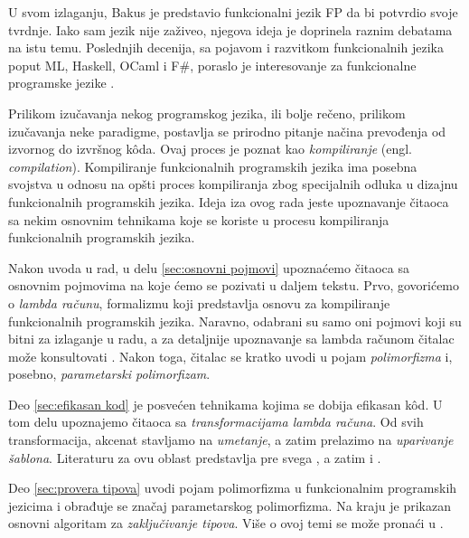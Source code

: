 \documentclass[a4paper]{article}
\begin{document}
U svom izlaganju, Bakus je predstavio funkcionalni jezik FP da bi potvrdio svoje tvrdnje. Iako sam jezik nije zaživeo, njegova ideja je doprinela raznim debatama na istu temu. Poslednjih decenija, sa pojavom i razvitkom funkcionalnih jezika poput ML, Haskell, OCaml i F\#, poraslo je interesovanje za funkcionalne programske jezike \cite{Concepts-of-Programming-Languages}.

Prilikom izučavanja nekog programskog jezika, ili bolje rečeno, prilikom izučavanja neke paradigme, postavlja se prirodno pitanje načina prevođenja od izvornog do izvršnog k\^oda. Ovaj proces je poznat kao \textit{kompiliranje} (engl. \textit{compilation}). Kompiliranje funkcionalnih programskih jezika ima posebna svojstva u odnosu na opšti proces kompiliranja zbog specijalnih odluka u dizajnu funkcionalnih programskih jezika. Ideja iza ovog rada jeste upoznavanje čitaoca sa nekim osnovnim tehnikama koje se koriste u procesu kompiliranja funkcionalnih programskih jezika.

Nakon uvoda u rad, u delu \ref{sec:osnovni pojmovi} upoznaćemo čitaoca sa osnovnim pojmovima na koje ćemo se pozivati u daljem tekstu. Prvo, govorićemo o \textit{lambda računu}, formalizmu koji predstavlja osnovu za kompiliranje funkcionalnih programskih jezika. Naravno, odabrani su samo oni pojmovi koji su bitni za izlaganje u radu, a za detaljnije upoznavanje sa lambda računom čitalac može konsultovati \cite{Introduction-to-Combinators-and-Lambda-Calculus}. Nakon toga, čitalac se kratko uvodi u pojam \textit{polimorfizma} i, posebno, \textit{parametarski polimorfizam}.

Deo \ref{sec:efikasan kod} je posvećen tehnikama kojima se dobija efikasan k\^od. U tom delu upoznajemo čitaoca sa \textit{transformacijama lambda računa}. Od svih transformacija, akcenat stavljamo na \textit{umetanje}, a zatim prelazimo na \textit{uparivanje šablona}. Literaturu za ovu oblast predstavlja pre svega \cite{the-implementation-of-functional-programming-languages}, a zatim i \cite{compilation-by-program-transformation, haskell-by-program-transformation, secrets-haskell-compiler-inliner, compiler-design, compiling-fl}.

Deo \ref{sec:provera tipova} uvodi pojam polimorfizma u funkcionalnim programskih jezicima i obrađuje se značaj parametarskog polimorfizma. Na kraju je prikazan osnovni algoritam za \textit{zaključivanje tipova}. Više o ovoj temi se može pronaći u \cite{the-implementation-of-functional-programming-languages, basic-typechecking}.
\end{document}
